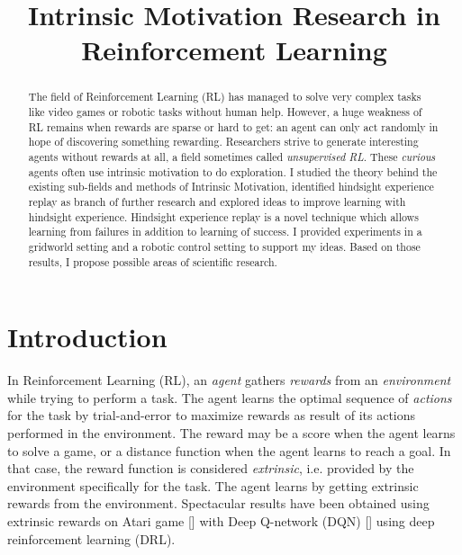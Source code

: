 \documentclass[conference]{IEEEtran}
\begin{document}
\title{
    Intrinsic Motivation Research in Reinforcement Learning
}

\author{
}
\maketitle

\begin{abstract}
The field of Reinforcement Learning (RL) has managed to solve very complex tasks like video games or robotic tasks without human help. However, a huge weakness of RL remains when rewards are sparse or hard to get: an agent can only act randomly in hope of discovering something rewarding. Researchers strive to generate interesting agents without rewards at all, a field sometimes called \textit{unsupervised RL}. These \textit{curious} agents often use intrinsic motivation to do exploration. I studied the theory behind the existing sub-fields and methods of Intrinsic Motivation, identified hindsight experience replay as branch of further research and explored ideas to improve learning with hindsight experience. Hindsight experience replay is a novel technique which allows learning from failures in addition to learning of success. I provided experiments in a gridworld setting and a robotic control setting to support my ideas. Based on those results, I propose possible areas of scientific research.
\end{abstract}

\section{Introduction}

In Reinforcement Learning (RL), an \textit{agent} gathers \textit{rewards} from an \textit{environment} while trying to perform a task. The agent learns the optimal sequence of \textit{actions} for the task by trial-and-error to maximize rewards as result of its actions performed in the environment. The reward may be a score when the agent learns to solve a game, or a distance function when the agent learns to reach a goal. In that case, the reward function is considered \textit{extrinsic}, i.e. provided by the environment specifically for the task. The agent learns by getting extrinsic rewards from the environment. Spectacular results have been obtained using extrinsic rewards on Atari game [\cite{bellemare2013arcade}] with Deep Q-network (DQN) [\cite{mnih2015human}] using deep reinforcement learning (DRL). 
\end{document}
